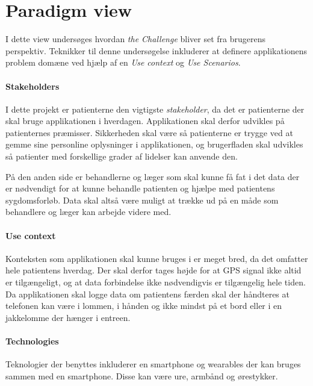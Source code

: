 

\section{Paradigm view}
I dette view undersøges hvordan \textit{the Challenge} bliver set fra brugerens perspektiv.
Teknikker til denne undersøgelse inkluderer at definere applikationens problem domæne ved hjælp af en \textit{Use context} og \textit{Use Scenarios}.

\paragraph{Stakeholders}
I dette projekt er patienterne den vigtigste \textit{stakeholder}, da det er patienterne der skal bruge applikationen i hverdagen.
Applikationen skal derfor udvikles på patienternes præmisser.
Sikkerheden skal være så patienterne er trygge ved at gemme sine personline oplysninger i applikationen, og brugerfladen skal udvikles så patienter med forskellige grader af lidelser kan anvende den.

På den anden side er behandlerne og læger som skal kunne få fat i det data der er nødvendigt for at kunne behandle patienten og hjælpe med patientens sygdomsforløb.
Data skal altså være muligt at trække ud på en måde som behandlere og læger kan arbejde videre med.


\paragraph{Use context}
Konteksten som applikationen skal kunne bruges i er meget bred, da det omfatter hele patientens hverdag.
Der skal derfor tages højde for at GPS signal ikke altid er tilgængeligt, og at data forbindelse ikke nødvendigvis er tilgængelig hele tiden.
Da applikationen skal logge data om patientens færden skal der håndteres at telefonen kan være i lommen, i hånden og ikke mindst på et bord eller i en jakkelomme der hænger i entreen.


\paragraph{Technologies}
Teknologier der benyttes inkluderer en smartphone og wearables der kan bruges sammen med en smartphone.
Disse kan være ure, armbånd og ørestykker.

